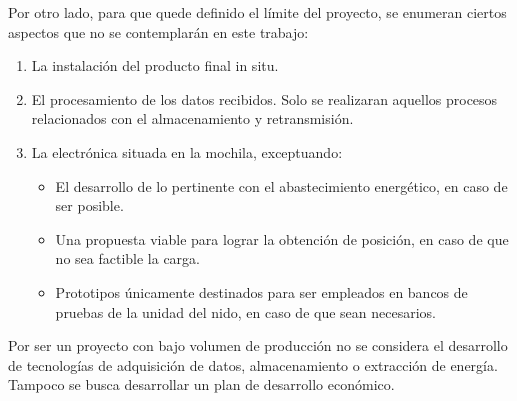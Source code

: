 Por otro lado, para que quede definido el límite del proyecto, se enumeran ciertos aspectos que no se contemplarán en este trabajo:
\begin{enumerate}
	\item La instalación del producto final in situ.
	\item El procesamiento de los datos recibidos. Solo se realizaran aquellos procesos relacionados con el almacenamiento y retransmisión.
	\item La electrónica situada en la mochila, exceptuando:
	\begin{itemize}
		\item El desarrollo de lo pertinente con el abastecimiento energético, en caso de ser posible.
		\item Una propuesta viable para lograr la obtención de posición, en caso de que no sea factible la carga.
		\item Prototipos únicamente destinados para ser empleados en bancos de pruebas de la unidad del nido, en caso de que sean necesarios.	
	\end{itemize}	
\end{enumerate}

Por ser un proyecto con bajo volumen de producción no se considera el desarrollo de tecnologías de adquisición de datos, almacenamiento o extracción de energía. Tampoco se busca desarrollar un plan de desarrollo económico.